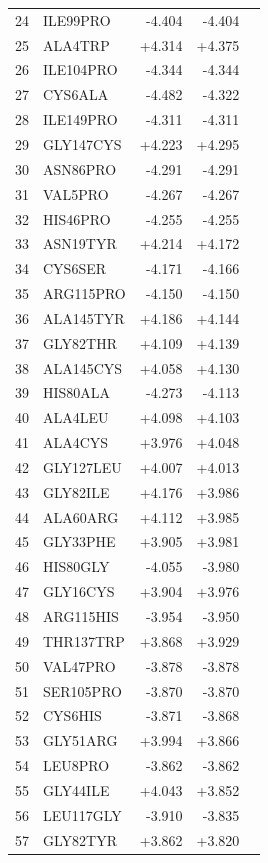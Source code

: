 \begin{longtable}{r l r r c}
24 & ILE99PRO & -4.404 & -4.404 &  \\
25 & ALA4TRP & +4.314 & +4.375 &  \\
26 & ILE104PRO & -4.344 & -4.344 &  \\
27 & CYS6ALA & -4.482 & -4.322 &  \\
28 & ILE149PRO & -4.311 & -4.311 &  \\
29 & GLY147CYS & +4.223 & +4.295 &  \\
30 & ASN86PRO & -4.291 & -4.291 &  \\
31 & VAL5PRO & -4.267 & -4.267 &  \\
32 & HIS46PRO & -4.255 & -4.255 &  \\
33 & ASN19TYR & +4.214 & +4.172 &  \\
34 & CYS6SER & -4.171 & -4.166 &  \\
35 & ARG115PRO & -4.150 & -4.150 &  \\
36 & ALA145TYR & +4.186 & +4.144 &  \\
37 & GLY82THR & +4.109 & +4.139 &  \\
38 & ALA145CYS & +4.058 & +4.130 &  \\
39 & HIS80ALA & -4.273 & -4.113 &  \\
40 & ALA4LEU & +4.098 & +4.103 &  \\
41 & ALA4CYS & +3.976 & +4.048 &  \\
42 & GLY127LEU & +4.007 & +4.013 &  \\
43 & GLY82ILE & +4.176 & +3.986 &  \\
44 & ALA60ARG & +4.112 & +3.985 &  \\
45 & GLY33PHE & +3.905 & +3.981 &  \\
46 & HIS80GLY & -4.055 & -3.980 &  \\
47 & GLY16CYS & +3.904 & +3.976 &  \\
48 & ARG115HIS & -3.954 & -3.950 &  \\
49 & THR137TRP & +3.868 & +3.929 &  \\
50 & VAL47PRO & -3.878 & -3.878 &  \\
51 & SER105PRO & -3.870 & -3.870 &  \\
52 & CYS6HIS & -3.871 & -3.868 &  \\
53 & GLY51ARG & +3.994 & +3.866 &  \\
54 & LEU8PRO & -3.862 & -3.862 &  \\
55 & GLY44ILE & +4.043 & +3.852 &  \\
56 & LEU117GLY & -3.910 & -3.835 &  \\
57 & GLY82TYR & +3.862 & +3.820 &  \\

\end{longtable}
